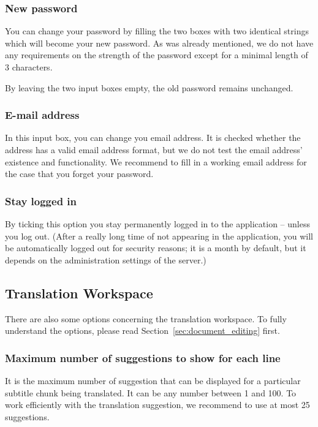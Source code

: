 \subsubsection{New password}

You can change your password by filling the two boxes with two identical strings which will become your new password. As was already mentioned, we do not have any requirements on the strength of the password except for a minimal length of 3 characters.

By leaving the two input boxes empty, the old password remains unchanged.

\subsubsection{E-mail address}

In this input box, you can change you email address. It is checked whether the address has a valid email address format, but we do not test the email address' existence and functionality. We recommend to fill in a working email address for the case that you forget your password.

\subsubsection{Stay logged in}

By ticking this option you stay permanently logged in to the application -- unless you log out. (After a really long time of not appearing in the application, you will be automatically logged out for security reasons; it is a month by default, but it depends on the administration settings of the server.)

\subsection{Translation Workspace}

There are also some options concerning the translation workspace. To fully understand the options, please read Section~\ref{sec:document_editing} first.

\subsubsection{Maximum number of suggestions to show for each line}

It is the maximum number of suggestion that can be displayed for a particular subtitle chunk being translated. It can be any number between 1 and 100. To work efficiently with the translation suggestion, we recommend to use at most 25 suggestions.

